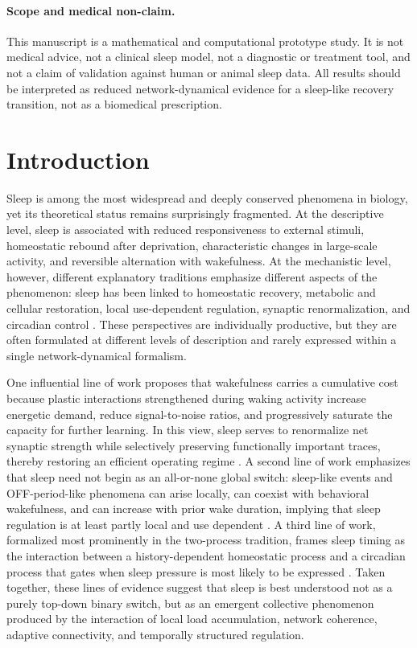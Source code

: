 \documentclass[12pt]{article}
\begin{document}
\paragraph{Scope and medical non-claim.}
This manuscript is a mathematical and computational prototype study. It is not medical advice, not a clinical sleep model, not a diagnostic or treatment tool, and not a claim of validation against human or animal sleep data. All results should be interpreted as reduced network-dynamical evidence for a sleep-like recovery transition, not as a biomedical prescription.

\section{Introduction}

Sleep is among the most widespread and deeply conserved phenomena in biology, yet its theoretical status remains surprisingly fragmented. At the descriptive level, sleep is associated with reduced responsiveness to external stimuli, homeostatic rebound after deprivation, characteristic changes in large-scale activity, and reversible alternation with wakefulness. At the mechanistic level, however, different explanatory traditions emphasize different aspects of the phenomenon: sleep has been linked to homeostatic recovery, metabolic and cellular restoration, local use-dependent regulation, synaptic renormalization, and circadian control \cite{Tononi2003, Tononi2006, Cirelli2015, Deboer2018, Borbely2022}. These perspectives are individually productive, but they are often formulated at different levels of description and rarely expressed within a single network-dynamical formalism.

One influential line of work proposes that wakefulness carries a cumulative cost because plastic interactions strengthened during waking activity increase energetic demand, reduce signal-to-noise ratios, and progressively saturate the capacity for further learning. In this view, sleep serves to renormalize net synaptic strength while selectively preserving functionally important traces, thereby restoring an efficient operating regime \cite{Tononi2003, Tononi2006, Cirelli2015, Tononi2014}. A second line of work emphasizes that sleep need not begin as an all-or-none global switch: sleep-like events and OFF-period-like phenomena can arise locally, can coexist with behavioral wakefulness, and can increase with prior wake duration, implying that sleep regulation is at least partly local and use dependent \cite{Vyazovskiy2011, Krueger2019, Siclari2018}. A third line of work, formalized most prominently in the two-process tradition, frames sleep timing as the interaction between a history-dependent homeostatic process and a circadian process that gates when sleep pressure is most likely to be expressed \cite{Borbely2022, Deboer2018}. Taken together, these lines of evidence suggest that sleep is best understood not as a purely top-down binary switch, but as an emergent collective phenomenon produced by the interaction of local load accumulation, network coherence, adaptive connectivity, and temporally structured regulation.
\end{document}

